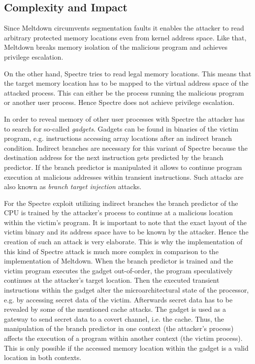 \documentclass[a4paper,oneside,openright] {scrreprt}
\begin{document}
\subsection{Complexity and Impact}
\label{ch:intro:motivation:A}

Since Meltdown circumvents segmentation faults it enables the attacker to read arbitrary protected memory locations 
even from kernel address space.
Like that, Meltdown breaks memory isolation of the malicious program and achieves privilege escalation. 

On the other hand, Spectre tries to read legal memory locations.
This means that the target memory location has to be mapped to the virtual address space of the attacked process.
This can either be the process running the malicious program or another user process.
Hence Spectre does not achieve privilege escalation.

In order to reveal memory of other user processes with Spectre the attacker has to search for so-called \textit{gadgets}.
Gadgets can be found in binaries of the victim program, e.g. instructions accessing array locations after an indirect branch condition.
Indirect branches are necessary for this variant of Spectre because the destination address for the next instruction gets predicted 
by the branch predictor.
If the branch predictor is manipulated it allows to continue program execution at malicious addresses within transient instructions. 
Such attacks are also known as \textit{branch target injection} attacks.

For the Spectre exploit utilizing indirect branches the branch predictor of the CPU is trained by the attacker's process 
to continue at a malicious location within the victim's program. 
It is important to note that the exact layout of the victim binary and its address space have to be known by the attacker.
Hence the creation of such an attack is very elaborate.
This is why the implementation of this kind of Spectre attack is much more complex in comparison to the implementation of Meltdown.
When the branch predictor is trained and the victim program executes the gadget out-of-order, 
the program speculatively continues at the attacker's target location.
Then the executed transient instructions within the gadget alter the microarchitectural state of the processor, e.g.
by accessing secret data of the victim.
Afterwards secret data has to be revealed by some of the mentioned cache attacks.
The gadget is used as a gateway to send secret data to a covert channel, i.e. the cache.
Thus, the manipulation of the branch predictor in one context (the attacker's process) affects the execution of a program
within another context (the victim process). 
This is only possible if the accessed memory location within the gadget is a valid location in both contexts.
\end{document}
